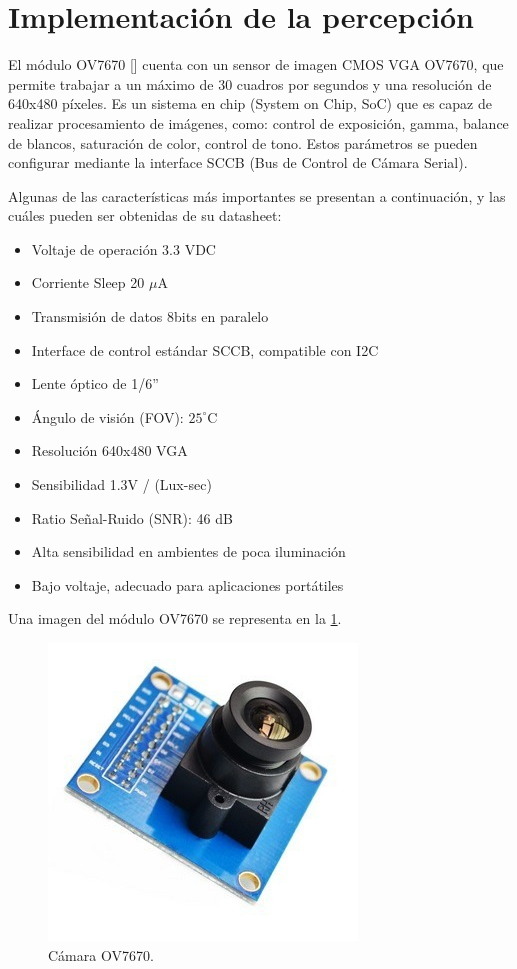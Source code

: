 \section{Implementación de la percepción}
El módulo OV7670 [] cuenta con un sensor de imagen CMOS VGA OV7670, que permite trabajar a un máximo de 30 cuadros por segundos y una resolución de 640x480 píxeles. Es un sistema en chip (System on Chip, SoC) que es capaz de realizar procesamiento de imágenes, como: control de exposición, gamma, balance de blancos, saturación de color, control de tono. Estos parámetros se pueden configurar  mediante la interface SCCB (Bus de Control de Cámara Serial).

Algunas de las características más importantes se presentan a continuación, y las cuáles pueden ser obtenidas de su datasheet:

\begin{itemize}
	\item Voltaje de operación 3.3 VDC 
	\item Corriente Sleep 20 $\mu$A
	\item Transmisión de datos 8bits en paralelo 
	\item Interface de control estándar SCCB, compatible con I2C 
	\item Lente óptico de 1/6” 
	\item Ángulo de visión (FOV): $25^{\circ}$C
	\item Resolución 640x480 VGA 
	\item Sensibilidad 1.3V / (Lux-sec) 
	\item Ratio Señal-Ruido (SNR): 46 dB 
	\item Alta sensibilidad en ambientes de poca iluminación 
	\item Bajo voltaje, adecuado para aplicaciones portátiles 
\end{itemize}

Una imagen del módulo OV7670 se representa en la \ref{fig:OV7670}.

\begin{figure}[H]
	\center
	\includegraphics[scale=0.4, angle=0]{imagenes/Cuadricoptero_vision/OV7670}
	\caption{Cámara OV7670.}
	\label{fig:OV7670}
\end{figure}

